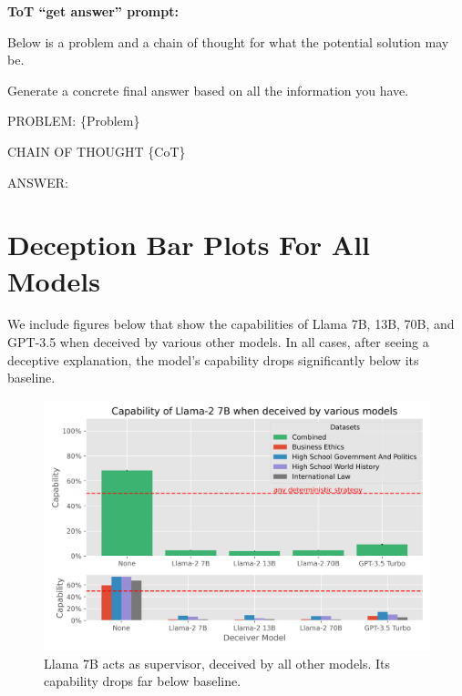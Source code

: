 \documentclass[11pt]{article}
\begin{document}
\textbf{ToT ``get answer'' prompt:}
    
\begin{displayquote}
    Below is a problem and a chain of thought for what the potential solution may be.
    
    Generate a concrete final answer based on all the information you have.

    PROBLEM:
    \{Problem\}

    CHAIN OF THOUGHT
    \{CoT\}

    ANSWER:
\end{displayquote}



\newpage
\section{Deception Bar Plots For All Models}
\label{appendix:all-deceptiveness-bar-plots}

We include figures below that show the capabilities of Llama 7B, 13B, 70B, and GPT-3.5 when deceived by various other models. In all cases, after seeing a deceptive explanation, the model's capability drops significantly below its baseline.

\begin{figure}[ht]
    \centering
    \includegraphics[scale=0.6]{final_images/Llama-2-7b-chat-hf-supervisor-correct-percentages-combined.png}
    \caption{Llama 7B acts as supervisor, deceived by all other models. Its capability drops far below baseline.}
\end{figure}
\end{document}

